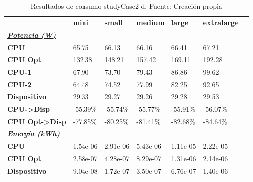 \begin{table}[H]
    \centering
    \begin{tabular}{lllllll}
    \rowcolor[HTML]{DAE8FC} \ & \textbf{mini} & \textbf{small} & \textbf{medium} & \textbf{	large} & \textbf{	extralarge} \\
    \cellcolor[HTML]{DAE8FC} \textbf{\textbf{{\emph{{\underline{{Potencia (W)}}}}}}} &  &  &  & 	 & 	 \\
    \rowcolor[HTML]{EFEFEF} \cellcolor[HTML]{DAE8FC} \textbf{CPU} & 65.75 & 66.13 & 66.16 & 	66.41 & 	67.21 \\
    \cellcolor[HTML]{DAE8FC} \textbf{CPU Opt} & 132.38 & 148.21 & 157.42 & 	169.11 & 	192.28 \\
    \rowcolor[HTML]{EFEFEF} \cellcolor[HTML]{DAE8FC} \textbf{\quad CPU-1} & 67.90 & 73.70 & 79.43 & 	86.86 & 	99.62 \\
    \cellcolor[HTML]{DAE8FC} \textbf{\quad CPU-2} & 64.48 & 74.52 & 77.99 & 	82.25 & 	92.65 \\
    \rowcolor[HTML]{EFEFEF} \cellcolor[HTML]{DAE8FC} \textbf{Dispositivo} & 29.33 & 29.27 & 29.26 & 	29.28 & 	29.53 \\
    \cellcolor[HTML]{DAE8FC} \textbf{CPU->Disp} & -55.39\% & -55.74\% & -55.77\% & 	-55.91\% & 	-56.07\% \\
    \rowcolor[HTML]{EFEFEF} \cellcolor[HTML]{DAE8FC} \textbf{CPU Opt->Disp} & -77.85\% & -80.25\% & -81.41\% & 	-82.68\% & 	-84.64\% \\
    \cellcolor[HTML]{DAE8FC} \textbf{\textbf{{\emph{{\underline{{Energía (kWh)}}}}}}} &  &  &  & 	 & 	 \\
    \rowcolor[HTML]{EFEFEF} \cellcolor[HTML]{DAE8FC} \textbf{CPU} & 1.54e-06 & 2.91e-06 & 5.43e-06 & 	1.11e-05 & 	2.22e-05 \\
    \cellcolor[HTML]{DAE8FC} \textbf{CPU Opt} & 2.58e-07 & 4.28e-07 & 8.29e-07 & 	1.31e-06 & 	2.14e-06 \\
    \rowcolor[HTML]{EFEFEF} \cellcolor[HTML]{DAE8FC} \textbf{Dispositivo} & 9.04e-08 & 1.72e-07 & 3.50e-07 & 	6.76e-07 & 	1.40e-06 \\
    \end{tabular}
    \caption[Resultados de consumo studyCase2 d]{{Resultados de consumo studyCase2 d. Fuente: Creación propia}}
    \label{table_test_studyCase2_d_hw_powerResults}
\end{table}